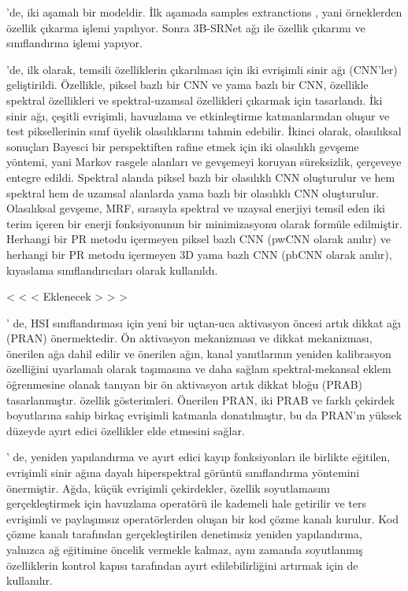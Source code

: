 \citep{jiang2019hyperspectral} 'de, iki aşamalı bir modeldir. İlk aşamada samples extranctions , yani örneklerden özellik çıkarma işlemi yapılıyor. Sonra 3B-SRNet  ağı ile özellik çıkarımı ve sınıflandırma işlemi yapıyor. 





\citep{gao2019classification}'de, ilk olarak, temsili özelliklerin çıkarılması için iki evrişimli sinir ağı (CNN'ler) geliştirildi.
Özellikle, piksel bazlı bir CNN ve yama bazlı bir CNN, özellikle spektral özellikleri ve spektral-uzamsal özellikleri çıkarmak için tasarlandı. İki sinir ağı, çeşitli evrişimli, havuzlama ve etkinleştirme katmanlarından oluşur ve test piksellerinin sınıf üyelik olasılıklarını tahmin edebilir. İkinci olarak, olasılıksal sonuçları Bayesci bir perspektiften rafine etmek için iki olasılıklı gevşeme yöntemi, yani Markov rasgele alanları ve gevşemeyi koruyan süreksizlik, çerçeveye entegre edildi. Spektral alanda piksel bazlı bir olasılıklı CNN oluşturulur ve hem spektral hem de uzamsal alanlarda yama bazlı bir olasılıklı CNN oluşturulur. Olasılıksal gevşeme, MRF, sırasıyla spektral ve uzaysal enerjiyi temsil eden iki terim içeren bir enerji fonksiyonunun bir minimizasyonu olarak formüle edilmiştir. Herhangi bir PR metodu içermeyen piksel bazlı CNN (pwCNN olarak anılır) ve herhangi bir PR metodu içermeyen 3D yama bazlı CNN (pbCNN olarak anılır), kıyaslama sınıflandırıcıları olarak kullanıldı.


\citep{wang2019classification} < < < Eklenecek > > >

\citep{gao2019hyperspectral}' de, HSI sınıflandırması için yeni bir uçtan-uca aktivasyon öncesi artık dikkat ağı (PRAN) önermektedir. Ön aktivasyon mekanizması ve dikkat mekanizması, önerilen ağa dahil edilir ve önerilen ağın, kanal yanıtlarının yeniden kalibrasyon özelliğini uyarlamalı olarak taşımasına ve daha sağlam spektral-mekansal eklem öğrenmesine olanak tanıyan bir ön aktivasyon artık dikkat bloğu (PRAB) tasarlanmıştır. özellik gösterimleri. Önerilen PRAN, iki PRAB ve farklı çekirdek boyutlarına sahip birkaç evrişimli katmanla donatılmıştır, bu da PRAN'ın yüksek düzeyde ayırt edici özellikler elde etmesini sağlar.

\citep{ouyang2018convolutional}' de, yeniden yapılandırma ve ayırt edici kayıp fonksiyonları ile birlikte eğitilen, evrişimli sinir ağına dayalı hiperspektral görüntü sınıflandırma yöntemini önermiştir. Ağda, küçük evrişimli çekirdekler, özellik soyutlamasını gerçekleştirmek için havuzlama operatörü ile kademeli hale getirilir ve ters evrişimli ve paylaşımsız operatörlerden oluşan bir kod çözme kanalı kurulur. Kod çözme kanalı tarafından gerçekleştirilen denetimsiz yeniden yapılandırma, yalnızca ağ eğitimine öncelik vermekle kalmaz, aynı zamanda soyutlanmış özelliklerin kontrol kapısı tarafından ayırt edilebilirliğini artırmak için de kullanılır.

